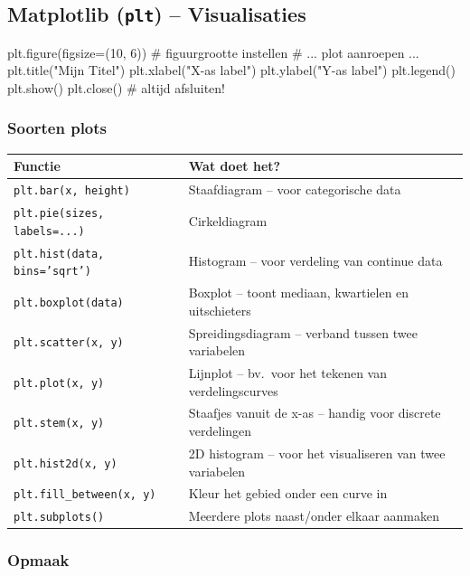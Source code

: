 \documentclass[a4paper,11pt]{article}
\begin{document}
\newpage
\subsection{Matplotlib (\texttt{plt}) -- Visualisaties}

\begin{pyblock}
plt.figure(figsize=(10, 6))  # figuurgrootte instellen
# ... plot aanroepen ...
plt.title("Mijn Titel")
plt.xlabel("X-as label")
plt.ylabel("Y-as label")
plt.legend()
plt.show()
plt.close()                  # altijd afsluiten!
\end{pyblock}

\subsubsection*{Soorten plots}

\begin{center}
\renewcommand{\arraystretch}{1.3}
\begin{tabularx}{\linewidth}{@{}lX@{}}
\toprule
\textbf{Functie} & \textbf{Wat doet het?} \\
\midrule
\texttt{plt.bar(x, height)} & Staafdiagram -- voor categorische data \\
\texttt{plt.pie(sizes, labels=...)} & Cirkeldiagram \\
\texttt{plt.hist(data, bins='sqrt')} & Histogram -- voor verdeling van continue data \\
\texttt{plt.boxplot(data)} & Boxplot -- toont mediaan, kwartielen en uitschieters \\
\texttt{plt.scatter(x, y)} & Spreidingsdiagram -- verband tussen twee variabelen \\
\texttt{plt.plot(x, y)} & Lijnplot -- bv.\ voor het tekenen van verdelingscurves \\
\texttt{plt.stem(x, y)} & Staafjes vanuit de x-as -- handig voor discrete verdelingen \\
\texttt{plt.hist2d(x, y)} & 2D histogram -- voor het visualiseren van twee variabelen \\
\texttt{plt.fill\_between(x, y)} & Kleur het gebied onder een curve in \\
\texttt{plt.subplots()} & Meerdere plots naast/onder elkaar aanmaken \\
\bottomrule
\end{tabularx}
\end{center}

\subsubsection*{Opmaak}
\end{document}
